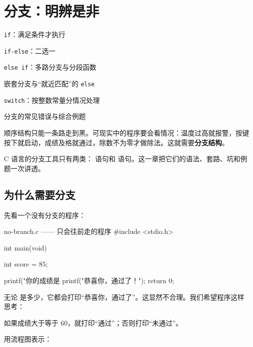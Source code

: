 \chapter{分支：明辨是非}

\begin{introduction}
  \item \texttt{if}：满足条件才执行
  \item \texttt{if-else}：二选一
  \item \texttt{else if}：多路分支与分段函数
  \item 嵌套分支与“就近匹配”的 \texttt{else}
  \item \texttt{switch}：按整数常量分情况处理
  \item 分支的常见错误与综合例题
\end{introduction}


顺序结构只能一条路走到黑。可现实中的程序要会看情况：温度过高就报警，按键按下就启动，成绩及格就通过，除数不为零才做除法。这就需要\textbf{分支结构}。

C 语言的分支工具只有两类： 语句和  语句。这一章把它们的语法、套路、坑和例题一次讲透。

\section{为什么需要分支}

先看一个没有分支的程序：

\begin{codebox}{no-branch.c —— 只会往前走的程序}
#include <stdio.h>

int main(void)
{
    int score = 85;

    printf("你的成绩是 %
    printf("恭喜你，通过了！\n");
    return 0;
}
\end{codebox}

无论  是多少，它都会打印“恭喜你，通过了”。这显然不合理。我们希望程序这样思考：

\begin{center}
\kaishu 如果成绩大于等于 60，就打印“通过”；否则打印“未通过”。
\end{center}

用流程图表示：

